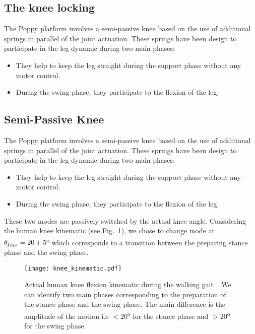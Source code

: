 \subsection{The knee locking} %
The Poppy platform involves a semi-passive knee based on the use of additional springs in parallel of the joint actuation.
These springs have been design to participate in the leg dynamic during two main phases:
\begin{itemize}
    \item They help to keep the leg straight during the support phase without any motor control.
    \item During the swing phase, they participate to the flexion of the leg.
\end{itemize}

\subsection{Semi-Passive Knee} %
\label{sub:knee}

The Poppy platform involves a semi-passive knee based on the use of additional springs in parallel of the joint actuation. These springs have been design to participate in the leg dynamic during two main phases:
\begin{itemize}
    \item They help to keep the leg straight during the support phase without any motor control.
    \item During the swing phase, they participate to the flexion of the leg.
\end{itemize}

These two modes are passively switched by the actual knee angle. Considering the human knee kinematic (see Fig.~\ref{fig:human_knee_kinematic}), we chose to change mode at $\theta_{knee} = 20+5$\textsuperscript{o}  which corresponds to a transition between the preparing stance phase and the swing phase.

\begin{figure}[thpb]
    \centering
    \texttt{[image: knee\_kinematic.pdf]}
    \caption{Actual human knee flexion kinematic during the walking gait~\cite{Nester2003}. We can identify two main phases corresponding to the preparation of the stance phase and the swing phase. The main difference is the amplitude of the motion i.e $<20$\textsuperscript{o}  for the stance phase and $>20$\textsuperscript{o} for the swing phase.}
    \label{fig:human_knee_kinematic}
\end{figure}

